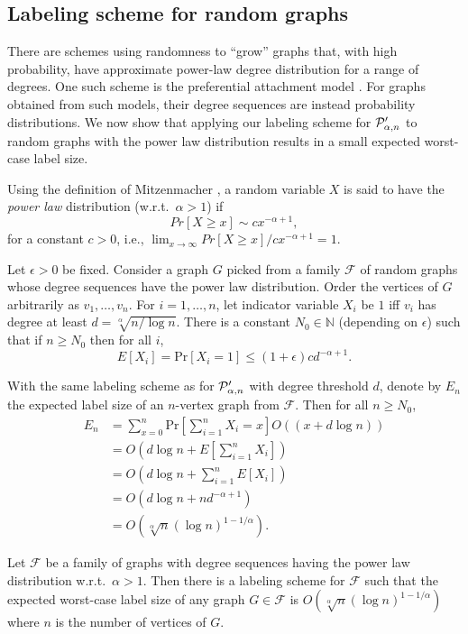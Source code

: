 \subsection{Labeling scheme for random graphs}
There are schemes using randomness to ``grow''  graphs that, with high probability, have approximate power-law degree distribution for a range of degrees. One such scheme is the preferential attachment model \cite{barabasi1999emergence}. For graphs obtained from such models, their degree sequences are instead probability distributions. We now show that applying our labeling scheme for $ \mathcal{P}'_{\alpha,n}$ to random graphs with the power law distribution results in a small expected worst-case label size.

Using the definition of Mitzenmacher \cite{mitzenmacher2004brief}, a random variable $X$ is said to have the \emph{power law} distribution (w.r.t.~$\alpha > 1$) if
\[
  Pr[X\geq x] \sim cx^{-\alpha+1},
\]
for a constant $c > 0$, i.e., $\lim_{x\to\infty}Pr[X\geq x]/cx^{-\alpha+1} = 1$.

Let $\epsilon > 0$ be fixed. Consider a graph $G$ picked from a family $\mathcal F$ of random graphs whose degree sequences have the power law distribution. Order the vertices of $G$ arbitrarily as $v_1,\ldots,v_n$. For $i=1,\ldots,n$, let indicator variable $X_i$ be $1$ iff $v_i$ has degree at least $d = \sqrt[\alpha]{n/\log n}$. There is a constant $N_0\in\mathbb N$ (depending on $\epsilon$) such that if $n\geq N_0$ then for all $i$,
\[
  E[X_i] = \mbox{Pr}[X_i = 1]\leq (1+\epsilon)cd^{-\alpha+1}.
\]

With the same labeling scheme as for $ \mathcal{P}'_{\alpha,n}$ with degree threshold $d$, denote by $E_n$ the expected label size of an $n$-vertex graph from $\mathcal F$. Then for all $n\geq N_0$,
\begin{align*}
  E_n & = \sum_{x=0}^n \mbox{Pr}\left[\sum_{i=1}^n X_i = x\right]O((x+d\log n))\\
                       & = O\left(d\log n + E\left[\sum_{i=1}^n X_i\right]\right)\\
                       & = O\left(d\log n + \sum_{i=1}^n E[X_i]\right)\\
                       & = O\left(d\log n + nd^{-\alpha+1}\right)\\
                       & = O\left(\sqrt[\alpha]n(\log n)^{1-1/\alpha}\right).
\end{align*}
\begin{theorem}\label{th:random}
Let $\mathcal F$ be a family of graphs with degree sequences having the power law distribution w.r.t.~$\alpha > 1$. Then there is a labeling scheme for $\mathcal F$ such that the expected worst-case label size of any graph $G\in\mathcal F$ is $O(\sqrt[\alpha]n(\log n)^{1-1/\alpha})$ where $n$ is the number of vertices of $G$.
\end{theorem}
